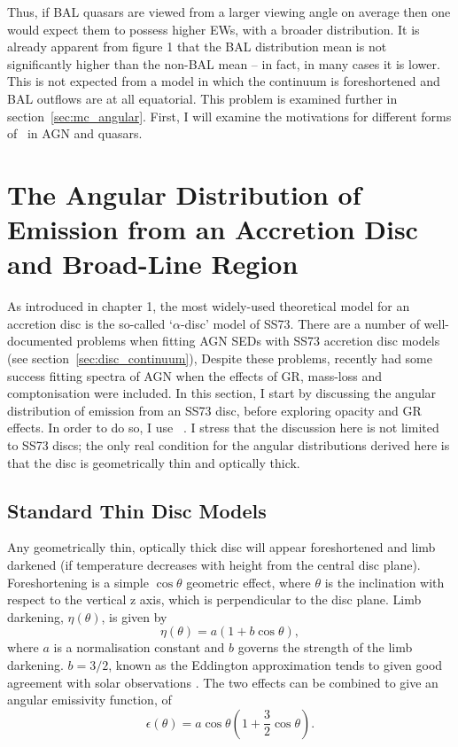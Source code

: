Thus, if BAL quasars are viewed from a larger viewing angle on average then one
would expect them to possess higher EWs, with a broader distribution.
It is already apparent from figure 1 that the BAL distribution mean 
is not significantly higher than the non-BAL
mean -- in fact, in many cases it is lower. This is not expected from a model
in which the continuum is foreshortened and BAL outflows are at all equatorial.
This problem is examined further in section~\ref{sec:mc_angular}. 
First, I will examine the motivations for different forms of \ept\ 
in AGN and quasars.

\section{The Angular Distribution of Emission from an Accretion Disc and Broad-Line Region}
\label{sec:disc_agn}

\noindent 
As introduced in chapter 1, the most widely-used theoretical model for an accretion disc
is the so-called `$\alpha$-disc' model of SS73. 
There are a number of well-documented problems when fitting 
AGN SEDs with SS73 accretion disc models (see section~\ref{sec:disc_continuum}), 
Despite these problems, \cite{capellupo2015} recently had 
some success fitting spectra of AGN when the effects of
GR, mass-loss and comptonisation were included.
In this section, I start by discussing the angular distribution of
emission from an SS73 disc, before exploring opacity and GR 
effects. In order to do so, I use \agn\
\citep{hubeny2000,davishubeny2006,davis2007}. I stress that the 
discussion here is not limited to SS73 discs; the only real condition
for the angular distributions derived here is that the 
disc is geometrically thin and optically thick.

\subsection{Standard Thin Disc Models}

\noindent
Any geometrically thin, optically thick disc will appear
foreshortened and limb darkened (if temperature decreases
with height from the central disc plane). 
Foreshortening is a simple $\cos \theta$ geometric effect, 
where $\theta$ is the inclination with respect to the vertical z axis, which
is perpendicular to the disc plane.
Limb darkening, $\eta(\theta)$, is given by
\begin{equation}
\eta(\theta) = a \left( 1 + b \cos \theta \right),
\end{equation}
where $a$ is a normalisation constant and $b$ governs the strength
of the limb darkening. $b=3/2$, known as the Eddington approximation
tends to given good agreement with solar observations 
\citep[e.g.][]{mihalas}. The two effects can be 
combined to give an angular emissivity function, of
\begin{equation}
\epsilon(\theta) = a \cos \theta \left( 1 + \frac{3}{2} \cos \theta \right).
\end{equation}

